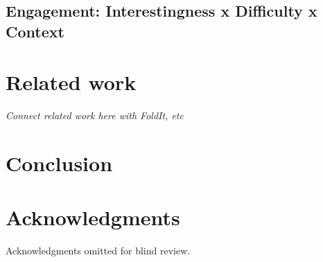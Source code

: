\documentclass{sigchi}
\begin{document}
%



\subsection{Engagement: Interestingness x Difficulty x Context}



\section{Related work}

\emph{Connect related work here with FoldIt, etc}

\section{Conclusion}

\section{Acknowledgments}
Acknowledgments omitted for blind review.

\balance

\end{document}
